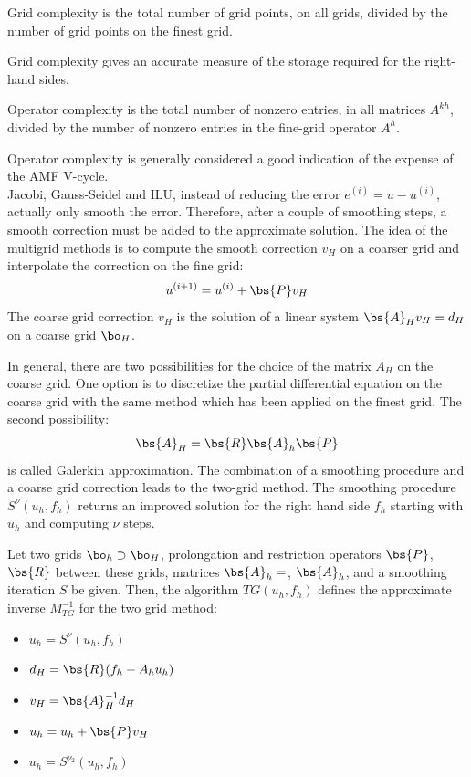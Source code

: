 \begin{definition}
Grid complexity is the total number of grid points, on all grids, divided by
the number of grid points on the finest grid.
\end{definition}
Grid complexity gives an accurate measure of the storage required for the
right-hand sides.
\begin{definition}
Operator complexity is the total number of nonzero entries, in all matrices
$A^{kh}$, divided by the number of nonzero entries in the fine-grid operator
$A^h$. 
\end{definition}
Operator complexity  is generally considered a good indication of the expense
of the AMF V-cycle.\\

Jacobi, Gauss-Seidel and ILU, instead of reducing the error
$e^{(i)}=u-u^{(i)}$, actually only smooth the error. Therefore, after a couple
of smoothing steps, a smooth correction must be added to the approximate
solution. The idea of the multigrid methods is to compute the smooth
correction $v_H$ on a coarser grid and interpolate the correction on the fine
grid:
\begin{equation}
u^{(i+1)} = u^{(i)}+\bs{P} v_H
\end{equation}
The coarse grid correction $v_H$ is the solution of a linear system $\bs{A}_H v_H =
d_H$ on a coarse grid $\bo_H$.

In general, there are two possibilities for the choice of the matrix $A_H$ on
the coarse grid. One option is to discretize the partial differential equation
on the coarse grid with the same method which has been applied on the finest
grid. The second possibility:
\begin{equation}
\bs{A}_H = \bs{R} \bs{A}_h \bs{P}
\end{equation}
is called Galerkin approximation. The combination of a smoothing procedure and
a coarse grid correction leads to the two-grid method. The smoothing procedure
$S^{\nu}(u_h,f_h)$ returns an improved solution for the right hand side $f_h$
starting with $u_h$ and computing $\nu$ steps.
\begin{algorithm}
Let two grids $\bo_h \supset \bo_H$, prolongation and restriction operators
$\bs{P}$, $\bs{R}$ between these grids, matrices $\bs{A}_h=$, $\bs{A}_h$, and a 
smoothing iteration $S$ be given. Then, the algorithm $TG(u_h,f_h)$ defines
the approximate inverse $M_{TG}^{-1}$ for the two grid method:
\begin{itemize}
\item[] $u_h = S^{\nu} (u_h,f_h)$
\item[] $d_H = \bs{R}(f_h-A_h u_h)$
\item[] $v_H = \bs{A}_H^{-1} d_H$
\item[] $u_h = u_h+\bs{P} v_H$
\item[] $u_h = S^{\nu_2}(u_h,f_h)$
\end{itemize}
\label{tg}
\end{algorithm}

